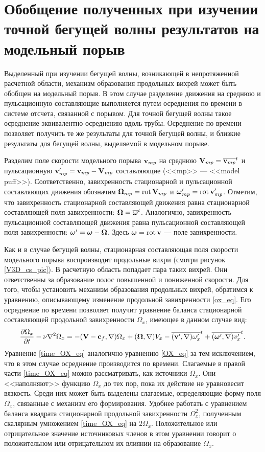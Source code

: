 \section{Обобщение полученных при изучении точной бегущей волны результатов на модельный порыв}

Выделенный при изучении бегущей волны, возникающей в непротяженной расчетной области, механизм образования продольных вихрей может быть обобщен на модельный порыв. В этом случае разделение движения на среднюю и пульсационную составляющие выполняется путем осреднения по времени в системе отсчета, связанной с порывом. Для точной бегущей волны такое осреднение эквивалентно осреднению вдоль трубы. Осреднение по времени позволяет получить те же результаты для точной бегущей волны, и близкие результаты для бегущей волны, выделяемой в модельном порыве. 

Разделим поле скорости модельного порыва $\mathbf{v}_{mp}$ на среднюю $\mathbf{V}_{mp} = \overline{\mathbf{v}_{mp}}^t$ и пульсационную $\mathbf{v}'_{mp} = \mathbf{v}_{mp} - \mathbf{V}_{mp}$ составляющие (<<mp>> --- <<model puff>>). Соответственно, завихренность стационарной и пульсационной составляющих движения обозначим $\mbox{\boldmath$\Omega$}_{mp} = \operatorname{rot} \mathbf{V}_{mp}$ и $\mbox{\boldmath$\omega$}'_{mp} = \operatorname{rot} \mathbf{v}'_{mp}$. Отметим, что завихренность стационарной составляющей движения равна стационарной составляющей поля завихренности: $\mbox{\boldmath$\Omega$} = \overline{\mbox{\boldmath$\omega$}}^t$. Аналогично, завихренность пульсационной составляющей движения равна пульсационной составляющей поля завихренности: $\mbox{\boldmath$\omega$}' = \mbox{\boldmath$\omega$} - \mbox{\boldmath$\Omega$}$. Здесь $\mbox{\boldmath$\omega$} = \operatorname{rot} \mathbf{v}$ --- поле завихренности.

Как и в случае бегущей волны, стационарная составляющая поля скорости модельного порыва воспроизводит продольные вихри (смотри рисунок \ref{V3D_cs_pic}). В расчетную область попадает пара таких вихрей. Они ответственны за образование полос повышенной и пониженной скорости. Для того, чтобы установить механизм образования продольных вихрей, обратимся к уравнению, описывающему изменение продольной завихренности \eqref{ox_eq}. Его осреднение по времени позволяет получит уравнение баланса стационарной составляющей продольной завихренности $\Omega_x$, имеющее в данном случае вид:
\begin{equation} \label{time_OX_eq}
\frac{\partial \Omega_x}{\partial t} - \nu\nabla^2 \Omega_x = - (\mathbf{V} - \mathbf{c}_f, \nabla) \Omega_x + (\mbox{\boldmath$\Omega$}, \nabla) V_x - \overline{(\mathbf{v}', \nabla) \omega'_x}^t + \overline{ (\mbox{\boldmath$\omega$}', \nabla) v'_x }^t.
\end{equation}
Уравнение \eqref{time_OX_eq} аналогично уравнению \eqref{OX_eq} за тем исключением, что в этом случае осреднение производится по времени. Слагаемые в правой части \eqref{time_OX_eq} можно рассматривать, как источники $\Omega_x$. Они <<наполняют>> функцию $\Omega_x$ до тех пор, пока их действие не уравновесит вязкость. Среди них может быть выделены слагаемые, определяющие форму поля $\Omega_x$, связанные с механизм его формирования. Удобнее работать с уравнением баланса квадрата стационарной продольной завихренности $\Omega_x^2$, полученным скалярным умножением \eqref{time_OX_eq} на $2\Omega_x$. Положительное или отрицательное значение источниковых членов в этом уравнении говорит о положительном или отрицательном их влиянии на образование $\Omega_x$. 


